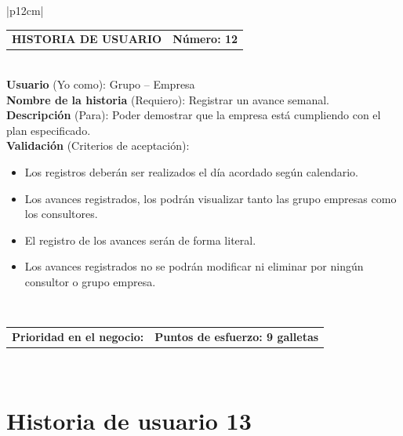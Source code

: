 \documentclass[11pt,letterpaper]{report}
\begin{document}
	\begin{center}	
		\begin{tabular}{|p{12cm}|}
			\hline
			\begin{tabular}{c|c}
				\textbf{HISTORIA DE USUARIO} & \textbf{Número: 12} \\
			\end{tabular} \\ \hline
			\textbf{Usuario} (Yo como): Grupo – Empresa \\ \hline
			\textbf{Nombre de la historia} (Requiero): Registrar un avance semanal. \\ \hline
			\textbf{Descripción} (Para): Poder demostrar que la empresa está cumpliendo con el plan especificado. \\ \hline
			\textbf{Validación} (Criterios de aceptación): \\
			\begin{minipage}{12cm}
				\begin{itemize}
					\item Los registros deberán ser realizados el día acordado según calendario.
					\item Los avances registrados, los podrán visualizar tanto las grupo empresas como los consultores.
					\item El registro de los avances serán de forma literal.
					\item Los avances registrados no se podrán modificar ni eliminar por ningún consultor o grupo empresa.
				\end{itemize}
			\end{minipage} \\ \hline
			\begin{tabular}{p{6cm}|c}
				\textbf{Prioridad en el negocio: } & \textbf{Puntos de esfuerzo: 9 galletas} \\
			\end{tabular} \\ \hline
		\end{tabular}
	\end{center}
	
	\section{Historia de usuario 13}
	
\end{document}
